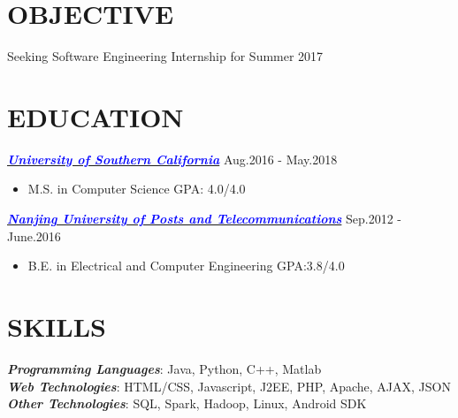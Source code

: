 \documentclass[margin,line]{res}
\begin{document}
\address{Address: 325 W. Adams Blvd 4105, Los Angeles CA 90007 \quad \quad Email: \href{mailto:chen147@usc.edu}{\textcolor{blue}{chen147@usc.edu}}}
\address{\hspace{101mm} Phone: (213) 479-3339}

\begin{resume}
\vspace{-2mm}
\section{OBJECTIVE}
	Seeking Software Engineering Internship for Summer 2017
\vspace{-1.5mm}
\section{EDUCATION}
                {\sl \href{http://www.usc.edu/}{\textcolor{blue}{\textbf{University of Southern California}}}}  \hfill Aug.2016 - May.2018
                    \begin{itemize}
                    \item M.S. in Computer Science \quad GPA: 4.0/4.0
                    \end{itemize}
                \vspace{-2mm}
                {\sl \href{http://www.njupt.edu.cn/}{\textcolor{blue}{\textbf{Nanjing University of Posts and Telecommunications}}}}  \hfill Sep.2012 - June.2016
                 \begin{itemize}
                   \item B.E. in Electrical and Computer Engineering \quad GPA:3.8/4.0                 \end{itemize}

\vspace{-2.5mm}

\section{SKILLS}
            {\sl \textbf{Programming Languages}}: Java, Python, C++, Matlab\\
            {\sl \textbf{Web Technologies}}: HTML/CSS, Javascript, J2EE, PHP, Apache, AJAX, JSON \\
            {\sl \textbf{Other Technologies}}: SQL, Spark, Hadoop, Linux, Android SDK\\
\vspace{-2.5mm}


\end{resume}
\end{document}
